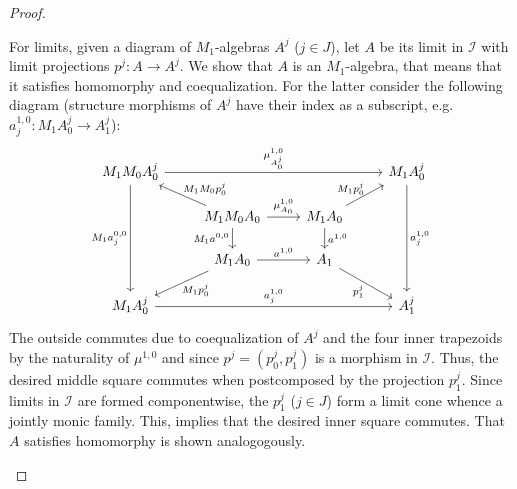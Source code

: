 \documentclass[sigconf,
			final%
			nonacm
                        ]{acmart}
\numberwithin{equation}{section}
\numberwithin{equation}{section}
\theoremstyle{plain}
\theoremstyle{definition}
\newcommand{\CatI}{\mathscr{I}}
\begin{document}
\begin{proof}
\begin{enumerate}
    For limits, given a diagram of
    $M_1$-algebras $A^j$ ($j \in J$), let $A$ be its limit in $\CatI$
    with limit projections $p^j\colon A \to A^j$. We show that $A$ is an
    $M_1$-algebra, that means that it satisfies homomorphy and
    coequalization. For the latter consider the following diagram
    (structure morphisms of $A^j$ have their index as a subscript,
    e.g.~$a^{1,0}_j\colon M_1A^j_0 \to A^j_1$):
    \[
      \begin{tikzcd}[row sep=15]
        M_1M_0A^j_0
        \ar{rrr}{\mu^{1,0}_{A^j_0}}
        \ar{ddd}[swap]{M_1a^{0,0}_j}
        &&&
        M_1A^j_0
        \ar{ddd}{a^{1,0}_j}
        \\
        &
        M_1M_0A_0\ar{lu}[swap,inner sep=0]{M_1M_0p_0^j}
        \ar{r}{\mu^{1,0}_{A_0}}
        \ar{d}[swap]{M_1a^{0,0}}
        &
        M_1A_0
        \ar{ru}[inner sep=0]{M_1p_0^j}
        \ar{d}{a^{1,0}}
        \\
        &
        M_1A_0
        \ar{ld}[inner sep = 0]{M_1p_0^j}
        \ar{r}{a^{1,0}}
        &
        A_1
        \ar{rd}[swap, inner sep = 1]{p_1^j}
        \\
        M_1A^j_0
        \ar{rrr}{a^{1,0}_j}
        &&&
        A^j_1
      \end{tikzcd}
    \]
    The outside commutes due to coequalization of $A^j$ and the four
    inner trapezoids by the naturality of $\mu^{1,0}$ and since
    $p^j = (p^j_0, p^j_1)$ is a morphism in $\CatI$. Thus, the desired
    middle square commutes when postcomposed by the projection
    $p^j_1$. Since limits in $\CatI$ are formed componentwise, the
    $p^j_1$ ($j \in J$) form a limit cone whence a jointly monic
    family. This, implies that the desired inner square commutes.
    That $A$ satisfies homomorphy is shown analogogously.


\end{enumerate}
\end{proof}
\end{document}
